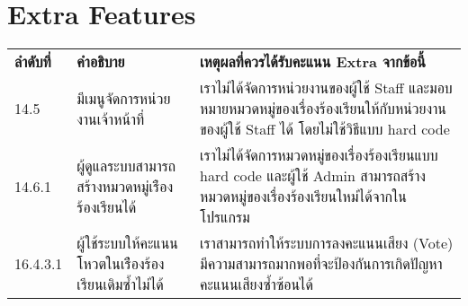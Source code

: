 \section{Extra Features}

\begin{tabularx}{\textwidth}{@{} l l l }
\textbf{ลำดับที่}         & \textbf{คำอธิบาย}                                                             & \textbf{เหตุผลที่ควรได้รับคะแนน Extra จากข้อนี้} \\
14.5                   & \parbox[t]{0.3\textwidth}{มีเมนูจัดการหน่วยงานเจ้าหน้าที่}                           & \parbox[t]{0.5\textwidth}{เราไม่ได้จัดการหน่วยงานของผู้ใช้ Staff และมอบหมายหมวดหมู่ของเรื่องร้องเรียนให้กับหน่วยงานของผู้ใช้ Staff ได้ โดยไม่ใช้วิธีแบบ hard code}\\
14.6.1                 & \parbox[t]{0.3\textwidth}{ผู้ดูแลระบบสามารถสร้างหมวดหมู่เร่ืองร้องเรียนได้}             & \parbox[t]{0.5\textwidth}{เราไม่ได้จัดการหมวดหมู่ของเรื่องร้องเรียนแบบ hard code และผู้ใช้ Admin สามารถสร้างหมวดหมู่ของเรื่องร้องเรียนใหม่ได้จากในโปรแกรม}\\
16.4.3.1               & \parbox[t]{0.3\textwidth}{ผู้ใช้ระบบให้คะแนนโหวตในเร่ืองร้องเรียนเดิมซํ้าไม่ได้}          & \parbox[t]{0.5\textwidth}{เราสามารถทำให้ระบบการลงคะแนนเสียง (Vote) มีความสามารถมากพอที่จะป้องกันการเกิดปัญหาคะแนนเสียงซ้ำซ้อนได้}
\end{tabularx}

